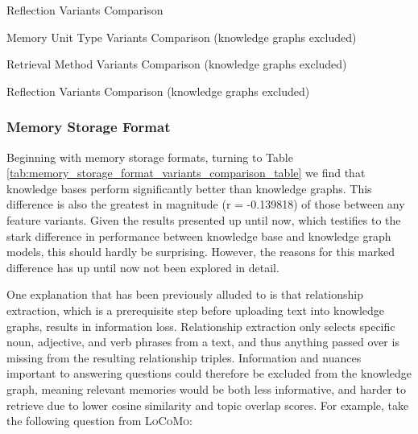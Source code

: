 \begin{table}[p]
\centering
\tiny

\caption{Reflection Variants Comparison}
\label{tab:reflection_variants_comparison_table}
\end{table}

\begin{table}[p]
\centering
\tiny

\caption{Memory Unit Type Variants Comparison (knowledge graphs excluded)}
\label{tab:memory_unit_type_variants_comparison_table_no_kg}
\end{table}

\begin{table}[p]
\centering
\tiny

\caption{Retrieval Method Variants Comparison (knowledge graphs excluded)}
\label{tab:retrieval_method_variants_comparison_table_no_kg}
\end{table}

\begin{table}[p]
\centering
\tiny

\caption{Reflection Variants Comparison (knowledge graphs excluded)}
\label{tab:reflection_variants_comparison_table_no_kg}
\end{table}


\subsubsection{Memory Storage Format}

Beginning with memory storage formats, turning to Table \ref{tab:memory_storage_format_variants_comparison_table} we find that knowledge bases perform significantly better than knowledge graphs. This difference is also the greatest in magnitude (r = -0.139818) of those between any feature variants. Given the results presented up until now, which testifies to the stark difference in performance between knowledge base and knowledge graph models, this should hardly be surprising. However, the reasons for this marked difference has up until now not been explored in detail. 

One explanation that has been previously alluded to is that relationship extraction, which is a prerequisite step before uploading text into knowledge graphs, results in information loss. Relationship extraction only selects specific noun, adjective, and verb phrases from a text, and thus anything passed over is missing from the resulting relationship triples. Information and nuances important to answering questions could therefore be excluded from the knowledge graph, meaning relevant memories would be both less informative, and harder to retrieve due to lower cosine similarity and topic overlap scores. For example, take the following question from \textsc{LoCoMo}:

